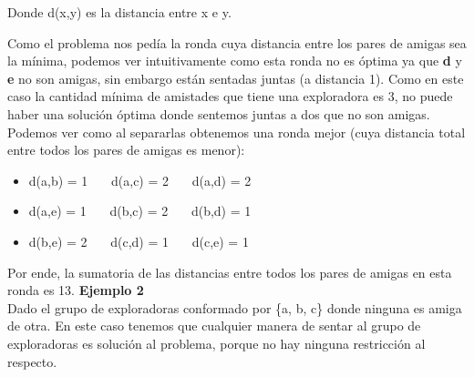 \documentclass[spanish,a4paper]{article}
\begin{document}
Donde d(x,y) es la distancia entre x e y.

Como el problema nos pedía la ronda cuya distancia entre los pares de amigas sea la mínima, podemos 
ver intuitivamente como esta ronda no es óptima ya que \textbf{d} y \textbf{e} no son amigas, sin embargo
están sentadas juntas (a distancia 1). Como en este caso la cantidad mínima de amistades que tiene
una exploradora es 3, no puede haber una solución óptima donde sentemos juntas a dos que no son amigas.
Podemos ver como al separarlas obtenemos una ronda mejor (cuya distancia total entre todos los
pares de amigas es menor):

\begin{figure}[H]
\begin{center}
\end{center}
\end{figure}

\begin{itemize}
  \item d(a,b) = 1   \ \ \ \inlineitem d(a,c) = 2 \ \ \ \inlineitem d(a,d) = 2
  \item d(a,e) = 1   \ \ \ \inlineitem d(b,c) = 2 \ \ \ \inlineitem d(b,d) = 1
  \item d(b,e) = 2   \ \ \ \inlineitem d(c,d) = 1 \ \ \ \inlineitem d(c,e) = 1
\end{itemize}

Por ende, la sumatoria de las distancias entre todos los pares de amigas en esta ronda es 13.
\vspace{2mm}
\textbf{Ejemplo 2}\\
\vspace{2mm}
Dado el grupo de exploradoras conformado por \{a, b, c\} donde ninguna es amiga de otra. En este caso tenemos que 
cualquier manera de sentar al grupo de exploradoras es solución al problema, porque no hay ninguna restricción al respecto.
\end{document}
